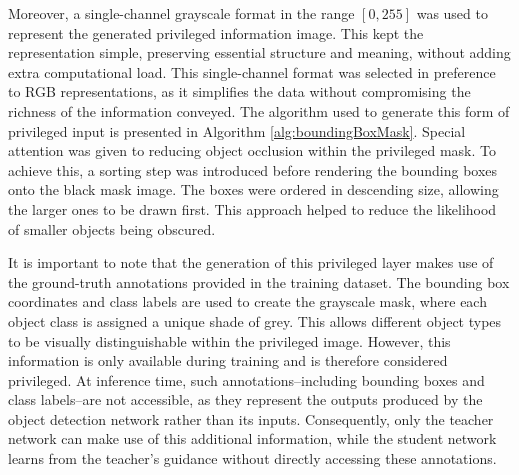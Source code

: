 Moreover, a single-channel grayscale format in the range $[0, 255]$ was used to represent the generated privileged information image. This kept the representation simple, preserving essential structure and meaning, without adding extra computational load. This single-channel format was selected in preference to RGB representations, as it simplifies the data without compromising the richness of the information conveyed. The algorithm used to generate this form of privileged input is presented in Algorithm \ref{alg:boundingBoxMask}. Special attention was given to reducing object occlusion within the privileged mask. To achieve this, a sorting step was introduced before rendering the bounding boxes onto the black mask image. The boxes were ordered in descending size, allowing the larger ones to be drawn first. This approach helped to reduce the likelihood of smaller objects being obscured.

It is important to note that the generation of this privileged layer makes use of the ground-truth annotations provided in the training dataset. The bounding box coordinates and class labels are used to create the grayscale mask, where each object class is assigned a unique shade of grey. This allows different object types to be visually distinguishable within the privileged image. However, this information is only available during training and is therefore considered privileged. At inference time, such annotations--including bounding boxes and class labels--are not accessible, as they represent the outputs produced by the object detection network rather than its inputs. Consequently, only the teacher network can make use of this additional information, while the student network learns from the teacher’s guidance without directly accessing these annotations.

        
        
